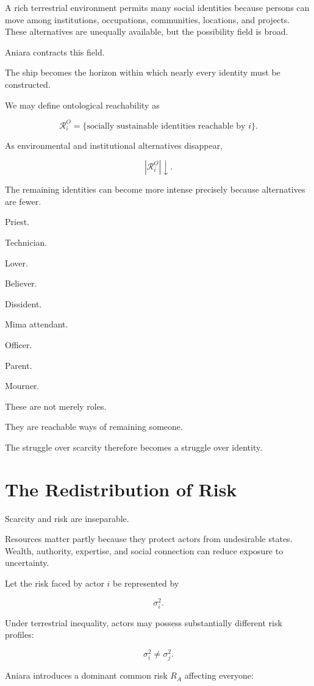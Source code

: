 \documentclass[11pt,oneside]{book}
\theoremstyle{definition}
\theoremstyle{remark}
\newcommand{\R}{\mathcal{R}}
\begin{document}
A rich terrestrial environment permits many social identities because persons can move among institutions, occupations, communities, locations, and projects. These alternatives are unequally available, but the possibility field is broad.

Aniara contracts this field.

The ship becomes the horizon within which nearly every identity must be constructed.

We may define ontological reachability as

\[
\R_i^{O}
=
\{
\text{socially sustainable identities reachable by }i
\}.
\]

As environmental and institutional alternatives disappear,

\[
|\R_i^{O}|\downarrow.
\]

The remaining identities can become more intense precisely because alternatives are fewer.

Priest.

Technician.

Lover.

Believer.

Dissident.

Mima attendant.

Officer.

Parent.

Mourner.

These are not merely roles.

They are reachable ways of remaining someone.

The struggle over scarcity therefore becomes a struggle over identity.

\section{The Redistribution of Risk}

Scarcity and risk are inseparable.

Resources matter partly because they protect actors from undesirable states. Wealth, authority, expertise, and social connection can reduce exposure to uncertainty.

Let the risk faced by actor \(i\) be represented by

\[
\sigma_i^2.
\]

Under terrestrial inequality, actors may possess substantially different risk profiles:

\[
\sigma_i^2\neq\sigma_j^2.
\]

Aniara introduces a dominant common risk \(R_A\) affecting everyone:
\end{document}
